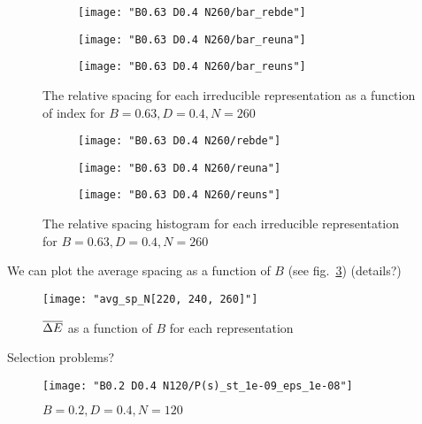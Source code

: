 \documentclass[../thesis.tex]{subfiles}
\begin{document}
\begin{figure}
  \centering
  \begin{subfigure}[b]{0.49\textwidth}
    \centering
    \texttt{[image: "B0.63 D0.4 N260/bar\_rebde"]}
  \end{subfigure}
  \begin{subfigure}[b]{0.49\textwidth}
    \centering
    \texttt{[image: "B0.63 D0.4 N260/bar\_reuna"]}
  \end{subfigure}
  \begin{subfigure}[b]{0.49\textwidth}
    \centering
    \texttt{[image: "B0.63 D0.4 N260/bar\_reuns"]}
  \end{subfigure}
  \caption{The relative spacing for each irreducible representation as a function
  of index for \(B=0.63, D=0.4, N=260\)}
  \label{fig:bar-rep-b0.63n260}
\end{figure}

\begin{figure}
  \centering
  \begin{subfigure}[b]{0.49\textwidth}
    \centering
    \texttt{[image: "B0.63 D0.4 N260/rebde"]}
  \end{subfigure}
  \begin{subfigure}[b]{0.49\textwidth}
    \centering
    \texttt{[image: "B0.63 D0.4 N260/reuna"]}
  \end{subfigure}
  \begin{subfigure}[b]{0.49\textwidth}
    \centering
    \texttt{[image: "B0.63 D0.4 N260/reuns"]}
  \end{subfigure}
  \caption{The relative spacing histogram for each irreducible representation for
  \(B=0.63, D=0.4, N=260\)}
\label{fig:hist-rep-b0.63n260}
\end{figure}

We can plot the average spacing as a function of $B$ (see fig.~\ref{fig:avgsp})
{\color{red} (details?)}

\begin{figure}
  \centering
  \texttt{[image: "avg\_sp\_N[220, 240, 260]"]}
  \caption{\(\overline{\Delta E}\) as a function of $B$ for each representation}
\label{fig:avgsp}
\end{figure}

{\color{red} Selection problems?}



\begin{figure}
  \texttt{[image: "B0.2 D0.4 N120/P(s)\_st\_1e-09\_eps\_1e-08"]}
  \caption{\(B=0.2, D=0.4, N=120\)}
\label{fig:P(s)-b0.2n120}
\end{figure}
\end{document}
